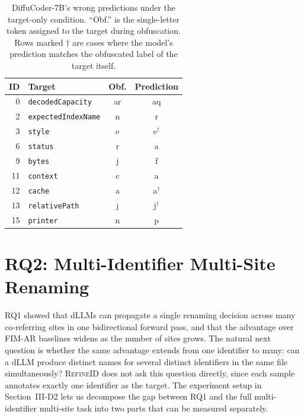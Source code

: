 \begin{table}[t]
  \centering
  \caption{DiffuCoder-7B's wrong predictions under the target-only condition.
           ``Obf.'' is the single-letter token assigned to the target during
           obfuscation. Rows marked $\dagger$ are cases where the model's
           prediction matches the obfuscated label of the target itself.}
  \label{tab:rq2_examples}
  \small
  \setlength{\tabcolsep}{6pt}
  \renewcommand{\arraystretch}{1.05}
  \begin{tabular}{@{}rlcc@{}}
    \toprule
    ID & Target & Obf. & Prediction \\
    \midrule
    0  & \texttt{decodedCapacity}   & ar & aq \\
    2  & \texttt{expectedIndexName} & n  & r  \\
    3  & \texttt{style}             & e  & e$^{\dagger}$ \\
    6  & \texttt{status}            & r  & a  \\
    9  & \texttt{bytes}             & j  & f  \\
    11 & \texttt{context}           & c  & a  \\
    12 & \texttt{cache}             & a  & a$^{\dagger}$ \\
    13 & \texttt{relativePath}      & j  & j$^{\dagger}$ \\
    15 & \texttt{printer}           & n  & p  \\
    \bottomrule
  \end{tabular}
\end{table}


\section{RQ2: Multi-Identifier Multi-Site Renaming}
\label{sec:rq2}

RQ1 showed that dLLMs can propagate a single renaming decision across many
co-referring sites in one bidirectional forward pass, and that the advantage
over FIM-AR baselines widens as the number of sites grows. The natural next
question is whether the same advantage extends from one identifier to many: can
a dLLM produce distinct names for several distinct identifiers in the same file
simultaneously? \textsc{RefineID} does not ask this question directly, since
each sample annotates exactly one identifier as the target. The experiment
setup in Section~III-D2 lets us decompose the gap between RQ1 and the full
multi-identifier multi-site task into two parts that can be measured separately.

